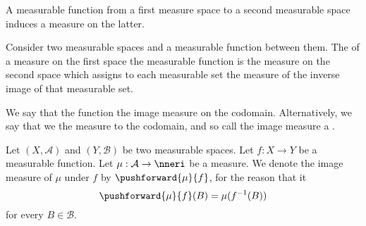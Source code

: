 
\sbasic


































\sstart
{}


A measurable
function from
a first measure space
to a second measurable space
induces a measure
on the latter.


Consider two measurable
spaces and a measurable
function between them.
The
of a measure on the first space
the measurable function
is the measure on the second space
which assigns to each measurable set
the measure of the inverse image of
that measurable set.

We say that the
function
the image measure
on the
codomain.
Alternatively,
we say that we
the measure to the
codomain, and so
call the image
measure
a
.


Let
$(X, \mathcal{A})$
and
$(Y, \mathcal{B})$
be two measurable spaces.
Let $f: X \to Y$ be
a measurable function.
Let
$\mu: \mathcal{A} \to \nneri$
be a measure.
We denote the
image measure of $\mu$
under $f$ by
$\pushforward{\mu}{f}$,
for the reason that it
\[
  \pushforward{\mu}{f}(B) = \mu(f^{-1}(B))
\]
for every $B \in \mathcal{B}$.

